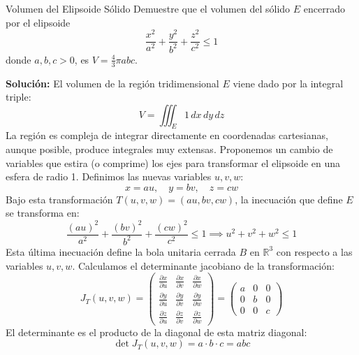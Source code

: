 \documentclass[11pt,a4paper]{article}
\begin{document}
\begin{ejerciciobox}{Volumen del Elipsoide Sólido}
Demuestre que el volumen del sólido $E$ encerrado por el elipsoide
\begin{equation*}
\frac{x^2}{a^2} + \frac{y^2}{b^2} + \frac{z^2}{c^2} \le 1
\end{equation*}
donde $a, b, c > 0$, es $V = \frac{4}{3}\pi abc$.

\textbf{Solución:}
El volumen de la región tridimensional $E$ viene dado por la integral triple:
\begin{equation*}
V = \iiint_E 1 \, dx \, dy \, dz
\end{equation*}
La región es compleja de integrar directamente en coordenadas cartesianas, aunque posible, produce integrales muy extensas. Proponemos un cambio de variables que estira (o comprime) los ejes para transformar el elipsoide en una esfera de radio 1. Definimos las nuevas variables $u, v, w$:
\begin{equation*}
x = au, \quad y = bv, \quad z = cw
\end{equation*}
Bajo esta transformación $T(u,v,w) = (au, bv, cw)$, la inecuación que define $E$ se transforma en:
\begin{equation*}
\frac{(au)^2}{a^2} + \frac{(bv)^2}{b^2} + \frac{(cw)^2}{c^2} \le 1 \implies u^2 + v^2 + w^2 \le 1
\end{equation*}
Esta última inecuación define la bola unitaria cerrada $B$ en $\mathbb{R}^3$ con respecto a las variables $u,v,w$.
Calculamos el determinante jacobiano de la transformación:
\begin{equation*}
J_T(u,v,w) = \begin{pmatrix}
\frac{\partial x}{\partial u} & \frac{\partial x}{\partial v} & \frac{\partial x}{\partial w} \\
\frac{\partial y}{\partial u} & \frac{\partial y}{\partial v} & \frac{\partial y}{\partial w} \\
\frac{\partial z}{\partial u} & \frac{\partial z}{\partial v} & \frac{\partial z}{\partial w}
\end{pmatrix} = \begin{pmatrix}
a & 0 & 0 \\
0 & b & 0 \\
0 & 0 & c
\end{pmatrix}
\end{equation*}
El determinante es el producto de la diagonal de esta matriz diagonal:
\begin{equation*}
\det J_T(u,v,w) = a \cdot b \cdot c = abc
\end{equation*}

\end{ejerciciobox}
\end{document}

